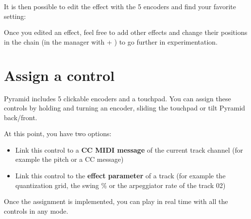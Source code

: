 
It is then possible to edit the effect with the 5 encoders \encodersicon{} and find your favorite setting:



Once you edited an effect, feel free to add other effects and change their positions in the chain (in the manager with  + \encodericon{}) to go further in experimentation.




\section{Assign a control}

Pyramid includes 5 clickable encoders and a touchpad. You can assign these controls by holding  and turning an encoder, sliding the touchpad or tilt Pyramid back/front.

At this point, you have two options:

\begin{itemize}
\item Link this control to a \textbf{CC MIDI message} of the current track channel (for example the pitch or a CC message)
\item Link this control to the \textbf{effect parameter} of a track (for example the quantization grid, the swing \% or the arpeggiator rate of the track 02)
\end{itemize}



Once the assignment is implemented, you can play in real time with all the controls in any mode.

